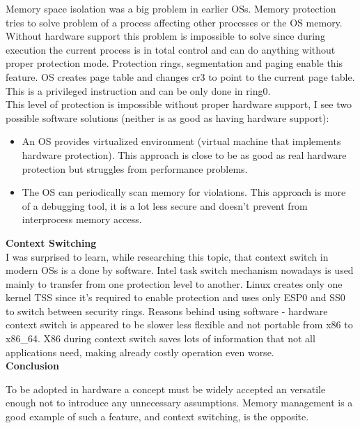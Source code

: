 \documentclass{article}
\begin{document}
        Memory space isolation was a big problem in earlier OSs.
        Memory protection tries to solve problem of a process affecting other processes or the OS
        memory. Without hardware support this problem is impossible to solve since during  execution
        the current process is in total control and can do anything without proper protection
        mode. Protection rings, segmentation and paging enable this feature.
        OS creates page table and changes cr3 to point to the current page table. This is
        a privileged instruction and can be only done in ring0. \\

        This level of protection is impossible without proper hardware support, I see two possible 
        software solutions (neither is as good as having hardware support):
        \begin{itemize}
            \item An OS provides virtualized environment (virtual machine that implements
                hardware protection). This approach is close to be as good as real hardware
                protection but struggles from performance problems.
            \item The OS can periodically scan memory for violations. This approach is more of
                a debugging tool, it is a lot less secure and doesn't prevent from interprocess 
                memory access.
        \end{itemize}

        \textbf{Context Switching}\\
        
        I was surprised to learn, while researching this topic,
        that context switch in modern OSs is a done by software.
        Intel task switch mechanism nowadays is used mainly to transfer from one
        protection level to another. Linux creates only one kernel TSS since it's required
        to enable protection  and uses only 
        ESP0 and SS0 to switch between security rings. 
        Reasons behind using software - hardware context switch is appeared to be slower
        less flexible and not portable from x86 to x86\_64. X86 during context switch
        saves lots of information that not all applications need, making already costly
        operation even worse.\\

        \textbf{Conclusion}

        To be adopted in hardware a concept must be widely accepted an versatile enough not
        to introduce any unnecessary assumptions. Memory management is a good example of
        such a feature, and context switching, is the opposite.


\end{document}
